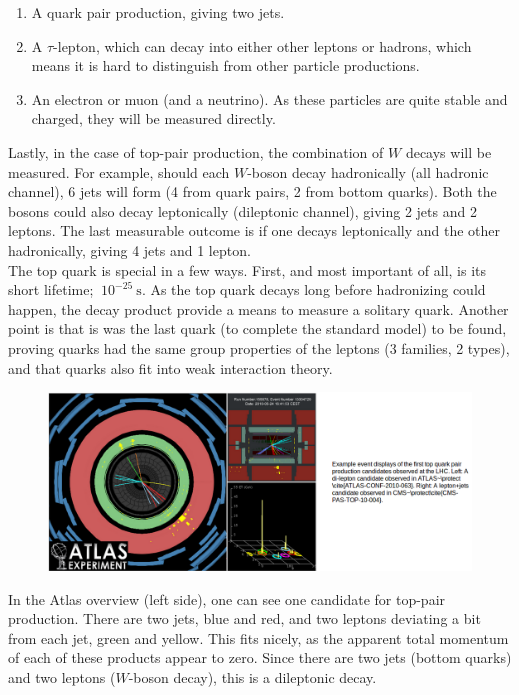 \documentclass[11pt,a4paper]{article}
\begin{document}
\begin{enumerate}
	\item A quark pair production, giving two jets.
	\item A $\tau$-lepton, which can decay into either other leptons or hadrons, which means it is hard to distinguish from other particle productions.
	\item An electron or muon (and a neutrino). As these particles are quite stable and charged, they will be measured directly.
\end{enumerate}

Lastly, in the case of top-pair production, the combination of $W$ decays will be measured. For example, should each $W$-boson decay hadronically (all hadronic channel), 6 jets will form (4 from quark pairs, 2 from bottom quarks). Both the bosons could also decay leptonically (dileptonic channel), giving 2 jets and 2 leptons. The last measurable outcome is if one decays leptonically and the other hadronically, giving 4 jets and 1 lepton.\\

The top quark is special in a few ways. First, and most important of all, is its short lifetime; $~10^{-25}\:\text{s}$. As the top quark decays long before hadronizing could happen, the decay product provide a means to measure a solitary quark. Another point is that is was the last quark (to complete the standard model) to be found, proving quarks had the same group properties of the leptons (3 families, 2 types), and that quarks also fit into weak interaction theory.\\

\begin{figure}
	\includegraphics[width=\textwidth]{Overview.png}
\end{figure}

In the Atlas overview (left side), one can see one candidate for top-pair production. There are two jets, blue and red, and two leptons deviating a bit from each jet, green and yellow. This fits nicely, as the apparent total momentum of each of these products appear to zero. Since there are two jets (bottom quarks) and two leptons ($W$-boson decay), this is a dileptonic decay.
\end{document}
